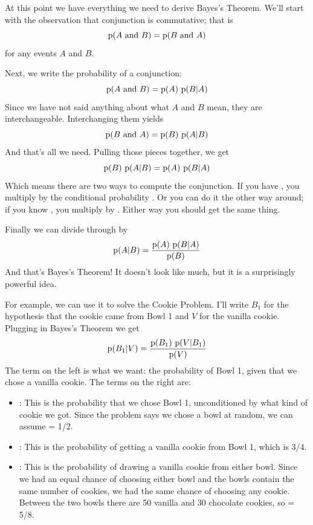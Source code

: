 \documentclass[12pt]{book}
\begin{document}
At this point we have everything we need to derive Bayes's Theorem.
We'll start with the observation that conjunction is commutative; that is
%
\[ \mathrm{p}(A ~\mathrm{and}~ B) = \mathrm{p}(B ~\mathrm{and}~ A) \]
%
for any events $A$ and $B$.

Next, we write the probability of a conjunction:
%
\[ \mathrm{p}(A ~\mathrm{and}~ B) = \mathrm{p}(A)~\mathrm{p}(B|A) \]
%
Since we have not said anything about what $A$ and $B$ mean, they
are interchangeable.  Interchanging them yields
%
\[ \mathrm{p}(B ~\mathrm{and}~ A) = \mathrm{p}(B)~\mathrm{p}(A|B) \]
%
And that's all we need.  Pulling those pieces together, we get
%
\[ \mathrm{p}(B)~\mathrm{p}(A|B) = \mathrm{p}(A)~\mathrm{p}(B|A) \]
%
Which means there are two ways to compute the conjunction.
If you have , you multiply by the conditional
probability .  Or you can do it the other way around; if you
know , you multiply by .  Either way you should get
the same thing.

Finally we can divide through by 
%
\[ \mathrm{p}(A|B) = \frac{\mathrm{p}(A)~\mathrm{p}(B|A)}{\mathrm{p}(B)} \]
%
And that's Bayes's Theorem!  It doesn't look like much, but
it is a surprisingly powerful idea.

For example, we can use it to solve the Cookie Problem.  I'll write
$B_1$ for the hypothesis that the cookie came from Bowl 1
and $V$ for the vanilla cookie.  Plugging in Bayes's Theorem
we get
%
\[ \mathrm{p}(B_1|V) = \frac{\mathrm{p}(B_1)~\mathrm{p}(V|B_1)}{\mathrm{p}(V)} \]
%
The term on the left is what we want: the probability of Bowl 1, given
that we chose a vanilla cookie.  The terms on the right are:

\begin{itemize}

\item {}: This is the probability that we chose Bowl 1, unconditioned
by what kind of cookie we got.  Since the problem says we chose a
bowl at random, we can assume  = 1/2.

\item {}: This is the probability of getting a vanilla cookie
from Bowl 1, which is 3/4.

\item {}: This is the probability of drawing a vanilla cookie from
either bowl.  Since we had an equal chance of choosing either bowl
and the bowls contain the same number of cookies, we had the same
chance of choosing any cookie.  Between the two bowls there are
50 vanilla and 30
chocolate cookies, so  = 5/8.

\end{itemize}
\end{document}
